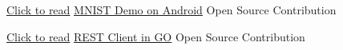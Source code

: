 \begin{cventries}
    \cventry
    {\href{https://goo.gl/AQ9CXM}{Click to read}} %
    {\href{https://goo.gl/AQ9CXM}{MNIST Demo on Android}} %
    {Open Source Contribution} %
    {} %
    {
      \begin{cvitems} %
      \end{cvitems}
    }

    \cventry
    {\href{https://goo.gl/xMAZcK}{Click to read}} %
    {\href{https://goo.gl/xMAZcK}{REST Client in GO}} %
    {Open Source Contribution} %
    {} %
    {
      \begin{cvitems} %
      \end{cvitems}
    }








\end{cventries}
